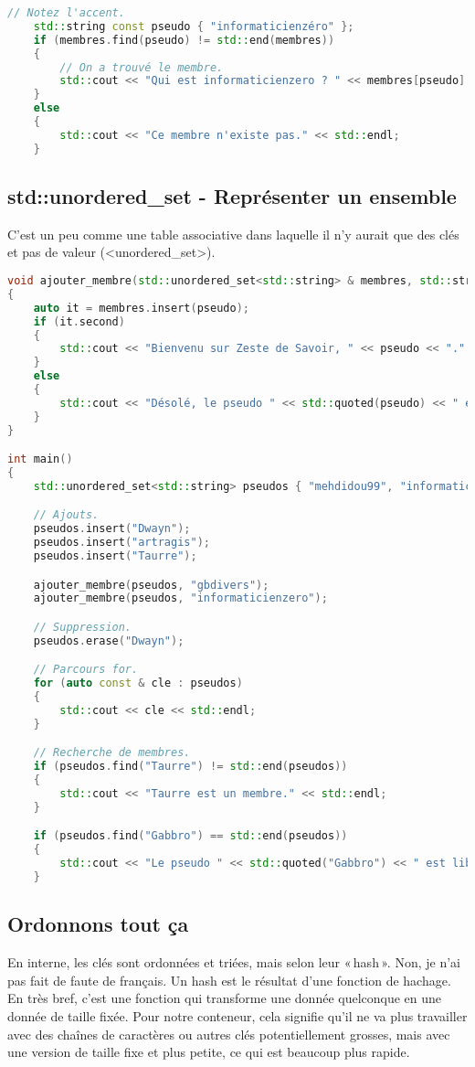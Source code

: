 \documentclass{article}
\begin{document}
\begin{itemize}
\begin{lstlisting}[language=C++]
    // Notez l'accent.
    std::string const pseudo { "informaticienzéro" };
    if (membres.find(pseudo) != std::end(membres))
    {
        // On a trouvé le membre.
        std::cout << "Qui est informaticienzero ? " << membres[pseudo] << std::endl;
    }
    else
    {
        std::cout << "Ce membre n'existe pas." << std::endl;
    }
\end{lstlisting}{}

\subsection{std::unordered_set - Représenter un ensemble}
 C’est un peu comme une table associative dans laquelle il n’y aurait que des clés et pas de valeur (<unordered_set>).
 
 \begin{lstlisting}[language=C++]
 void ajouter_membre(std::unordered_set<std::string> & membres, std::string const & pseudo)
{
    auto it = membres.insert(pseudo);
    if (it.second)
    {
        std::cout << "Bienvenu sur Zeste de Savoir, " << pseudo << "." << std::endl;
    }
    else
    {
        std::cout << "Désolé, le pseudo " << std::quoted(pseudo) << " est déjà pris." << std::endl;
    }
}

int main()
{
    std::unordered_set<std::string> pseudos { "mehdidou99", "informaticienzero" };

    // Ajouts.
    pseudos.insert("Dwayn");
    pseudos.insert("artragis");
    pseudos.insert("Taurre");

    ajouter_membre(pseudos, "gbdivers");
    ajouter_membre(pseudos, "informaticienzero");

    // Suppression.
    pseudos.erase("Dwayn");

    // Parcours for.
    for (auto const & cle : pseudos)
    {
        std::cout << cle << std::endl;
    }

    // Recherche de membres.
    if (pseudos.find("Taurre") != std::end(pseudos))
    {
        std::cout << "Taurre est un membre." << std::endl;
    }

    if (pseudos.find("Gabbro") == std::end(pseudos))
    {
        std::cout << "Le pseudo " << std::quoted("Gabbro") << " est libre." << std::endl;
    }
 \end{lstlisting}{}
 
\subsection{Ordonnons tout ça}
En interne, les clés sont ordonnées et triées, mais selon leur « hash ». Non, je n’ai pas fait de faute de français. Un hash est le résultat d’une fonction de hachage. En très bref, c’est une fonction qui transforme une donnée quelconque en une donnée de taille fixée. Pour notre conteneur, cela signifie qu’il ne va plus travailler avec des chaînes de caractères ou autres clés potentiellement grosses, mais avec une version de taille fixe et plus petite, ce qui est beaucoup plus rapide.


\end{itemize}
\end{document}
